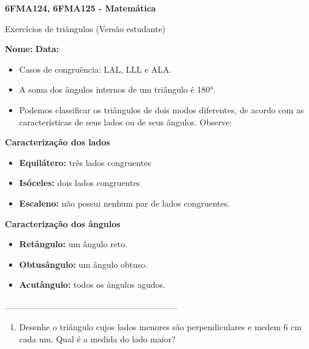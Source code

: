 \documentclass[a4paper,14pt]{article}
\begin{document}
	
	\noindent\textbf{6FMA124, 6FMA125 - Matemática} 
	
	\begin{center}Exercícios de triângulos (Versão estudante)
	\end{center}
	
	\noindent\textbf{Nome:} \underline{\hspace{10cm}}
	\noindent\textbf{Data:} \underline{\hspace{4cm}}
	
	
	\begin{multicols}{2}
	    \noindent \begin{itemize}
	    	\item Casos de congruência: LAL, LLL e ALA.
	    	\item A soma dos ângulos internos de um triângulo é 180°.
	    	\item Podemos classificar os triângulos de dois modos diferentes, de acordo com as características de seus lados ou de seus ângulos. Observe:
	    \end{itemize}
	    \textbf{Caracterização dos lados}
	    \begin{itemize}
	    	\item \textbf{Equilátero:} três lados congruentes
	    	\item \textbf{Isóceles:} dois lados congruentes
	    	\item \textbf{Escaleno:} não possui nenhum par de lados congruentes.
	    \end{itemize}
	     \textbf{Caracterização dos ângulos}
	    \begin{itemize}
	    	\item \textbf{Retângulo:} um ângulo reto.
	    	\item \textbf{Obtusângulo:} um ângulo obtuso.
	    	\item \textbf{Acutângulo:} todos os ângulos agudos.
	    \end{itemize}
		\noindent\textsubscript{--------------------------------------------------------------------------}
		\begin{enumerate} 
			\columnbreak
			\item Desenhe o triângulo cujos lados menores são perpendiculares e medem 6 cm cada um. Qual é a medida do lado maior? \\\\\\\\\\\\\\\\\\\\\\\\

\end{enumerate}
\end{multicols}
\end{document}
